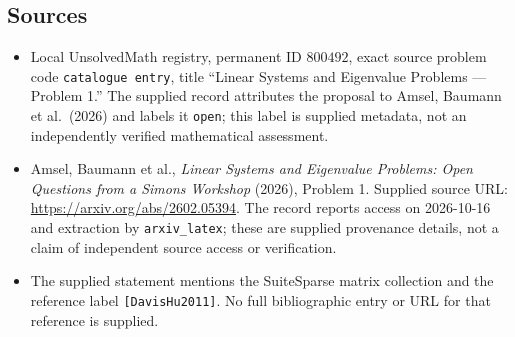 \documentclass[11pt]{article}
\begin{document}
\subsection{Sources}
\begin{itemize}
\item Local UnsolvedMath registry, permanent ID \(800492\), exact source problem code \texttt{catalogue entry}, title ``Linear Systems and Eigenvalue Problems --- Problem 1.'' The supplied record attributes the proposal to Amsel, Baumann et al.\ (2026) and labels it \texttt{open}; this label is supplied metadata, not an independently verified mathematical assessment.
\item Amsel, Baumann et al., \emph{Linear Systems and Eigenvalue Problems: Open Questions from a Simons Workshop} (2026), Problem 1. Supplied source URL: \url{https://arxiv.org/abs/2602.05394}. The record reports access on 2026-10-16 and extraction by \texttt{arxiv\_latex}; these are supplied provenance details, not a claim of independent source access or verification.
\item The supplied statement mentions the SuiteSparse matrix collection and the reference label \texttt{[DavisHu2011]}. No full bibliographic entry or URL for that reference is supplied.
\end{itemize}
\end{document}
